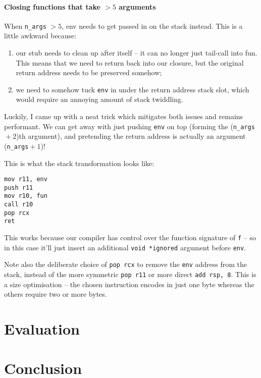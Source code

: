 \documentclass[12pt,a4paper,twoside,openright]{report}
\begin{document}
\subsubsection{Closing functions that take $> 5$ arguments}

When \lstinline{n_args} $> 5$, env needs to get passed in on the stack instead.
This is a little awkward because:
\begin{enumerate}
  \item our stub needs to clean up after itself -- it can no longer just tail-call into fun. This means that we need to return back into our closure, but the original return address needs to be preserved somehow;
  \item we need to somehow tuck \lstinline{env} in under the return address stack slot, which would require an annoying amount of stack twiddling.
\end{enumerate}

Luckily, I came up with a neat trick which mitigates both issues and remains performant. We can get away with just pushing \lstinline{env} on top (forming the (\lstinline{n_args}${}+2$)th argument), and pretending the return address is actually an argument (\lstinline{n_args}${}+1$)!

This is what the stack transformation looks like: %

\begin{lstlisting}
mov r11, env
push r11
mov r10, fun
call r10
pop rcx
ret
\end{lstlisting}

This works because our compiler has control over the function signature of
\lstinline{f}
-- so in this case it'll just insert an additional \lstinline{void *ignored} argument before \lstinline{env}.

Note also the deliberate choice of \lstinline{pop rcx} to remove the \lstinline{env} address from the stack, instead of the more symmetric \lstinline{pop r11} or more direct \lstinline{add rsp, 8}. This is a size optimisation -- the chosen instruction encodes in just one byte whereas the others require two or more bytes.


\chapter{Evaluation}


\chapter{Conclusion}
\end{document}
